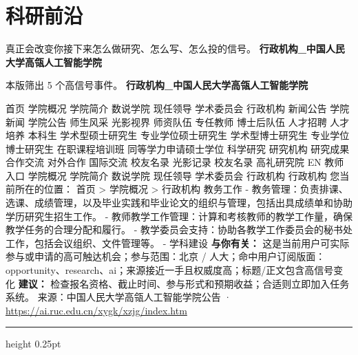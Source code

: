 \documentclass[10.5pt]{ctexart}
\begin{document}
\section*{科研前沿}
{\color{ormuted} 真正会改变你接下来怎么做研究、怎么写、怎么投的信号。}
\vspace{2mm}
{\LARGE\bfseries 行政机构\_中国人民大学高瓴人工智能学院}\par
\vspace{1mm}
{\color{ormuted} 本版筛出 5 个高信号事件。}
\vspace{3mm}
{\Large\bfseries 行政机构\_中国人民大学高瓴人工智能学院}\par
首页 学院概况 学院简介 数说学院 现任领导 学术委员会 行政机构 新闻公告 学院新闻 学院公告 师生风采 光影视界 师资队伍 专任教师 博士后队伍 人才招聘 人才培养 本科生 学术型硕士研究生 专业学位硕士研究生 学术型博士研究生 专业学位博士研究生 在职课程培训班 同等学力申请硕士学位 科学研究 研究机构 研究成果 合作交流 对外合作 国际交流 校友名录 光影记录 校友名录 高礼研究院 EN 教师入口 学院概况 学院简介 数说学院 现任领导 学术委员会 行政机构 行政机构 您当前所在的位置： 首页 > 学院概况 > 行政机构 教务工作 - 教务管理：负责排课、选课、成绩管理，以及毕业实践和毕业论文的组织与管理，包括出具成绩单和协助学历研究生招生工作。 - 教师教学工作管理：计算和考核教师的教学工作量，确保教学任务的合理分配和履行。 - 教学委员会支持：协助各教学工作委员会的秘书处工作，包括会议组织、文件管理等。 - 学科建设
\textbf{与你有关：} 这是当前用户可实际参与或申请的高可触达机会；参与范围：北京 / 人大；命中用户订阅版面：opportunity、research、ai；来源接近一手且权威度高；标题/正文包含高信号变化
\textbf{建议：} 检查报名资格、截止时间、参与形式和预期收益；合适则立即加入任务系统。
{\footnotesize\color{ormuted} 来源：中国人民大学高瓴人工智能学院公告 · \url{https://ai.ruc.edu.cn/xygk/xzjg/index.htm}}
\vspace{4mm}
\hrule height 0.25pt
\vspace{3mm}
\end{document}
